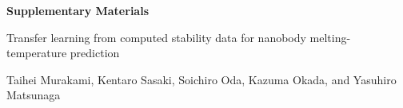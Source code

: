 \documentclass[fleqn]{bppb}
\begin{document}
\pagestyle{plain}

\begin{center}
  {\Large\bfseries Supplementary Materials}\par
  \vspace{1em}
  {\large Transfer learning from computed stability data for nanobody
  melting-temperature prediction}\par
  \vspace{0.5em}
  Taihei Murakami, Kentaro Sasaki, Soichiro Oda, Kazuma Okada, and
  Yasuhiro Matsunaga
\end{center}



\clearpage



\end{document}
